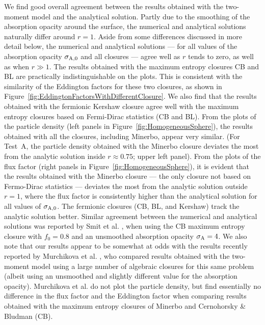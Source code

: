 We find good overall agreement between the results obtained with the two-moment model and the analytical solution.  
Partly due to the smoothing of the absorption opacity around the surface, the numerical and analytical solutions naturally differ around $r=1$.  
Aside from some differences discussed in more detail below, the numerical and analytical solutions --- for all values of the absorption opacity $\sigma_{{\rm A},0}$ and all closures --- agree well as $r$ tends to zero, as well as when $r\gg1$.  
The results obtained with the maximum entropy closures CB and BL are practically indistinguishable on the plots.  
This is consistent with the similarity of the Eddington factors for these two closures, as shown in Figure~\ref{fig:EddingtonFactorsWithDifferentClosure}.  
We also find that the results obtained with the fermionic Kershaw closure agree well with the maximum entropy closures based on Fermi-Dirac statistics (CB and BL).  
From the plots of the particle density (left panels in Figure~\ref{fig:HomogeneousSphere}), the results obtained with all the closures, including Minerbo, appear very similar.  
(For Test~A, the particle density obtained with the Minerbo closure deviates the most from the analytic solution inside $r\approx0.75$; upper left panel).  
From the plots of the flux factor (right panels in Figure~\ref{fig:HomogeneousSphere}), it is evident that the results obtained with the Minerbo closure --- the only closure not based on Fermo-Dirac statistics --- deviates the most from the analytic solution outside $r=1$, where the flux factor is consistently higher than the analytical solution for all values of $\sigma_{{\rm A},0}$.  
The fermionic closures (CB, BL, and Kershaw) track the analytic solution better.  
Similar agreement between the numerical and analytical solutions was reported by Smit et al. \cite{smit_etal_1997}, when using the CB maximum entropy closure with $f_{0}=0.8$ and an unsmoothed absorption opacity $\sigma_{{\rm A}}=4$.  
We also note that our results appear to be somewhat at odds with the results recently reported by Murchikova et al. \cite{murchikova_etal_2017}, who compared results obtained with the two-moment model using a large number of algebraic closures for this same problem (albeit using an unsmoothed and slightly different value for the absorption opacity).  
Murchikova et al. do not plot the particle density, but find essentially no difference in the flux factor and the Eddington factor when comparing results obtained with the maximum entropy closures of Minerbo and Cernohorsky \& Bludman (CB).  

